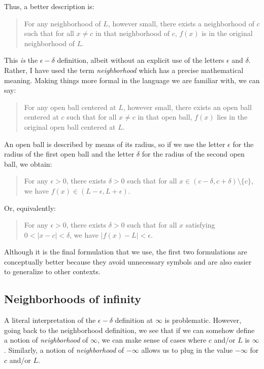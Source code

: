 \documentclass[10pt]{amsart}
\begin{document}
Thus, a better description is:

\begin{quote}
  For any neighborhood of $L$, however small, there exists a
  neighborhood of $c$ such that for all $x \ne c$ in that neighborhood
  of $c$, $f(x)$ is in the original neighborhood of $L$.
\end{quote}

This {\em is} the $\epsilon-\delta$ definition, albeit without an
explicit use of the letters $\epsilon$ and $\delta$. Rather, I have
used the term {\em neighborhood} which has a precise mathematical
meaning. Making things more formal in the language we are familiar
with, we can say:

\begin{quote}
  For any open ball centered at $L$, however small, there exists an
  open ball centered at $c$ such that for all $x \ne c$ in that open
  ball, $f(x)$ lies in the original open ball centered at $L$.
\end{quote}

An open ball is described by means of its radius, so if we use the
letter $\epsilon$ for the radius of the first open ball and the letter
$\delta$ for the radius of the second open ball, we obtain:

\begin{quote}
  For any $\epsilon > 0$, there exists $\delta > 0$ such that for all
  $x \in (c - \delta,c+\delta) \setminus \{ c \}$, we have $f(x) \in
  (L - \epsilon, L + \epsilon)$.
\end{quote}

Or, equivalently:

\begin{quote}
  For any $\epsilon > 0$, there exists $\delta > 0$ such that for all
  $x$ satisfying $0 < |x - c| < \delta$, we have $|f(x) - L| < \epsilon$.
\end{quote}

Although it is the final formulation that we use, the first two
formulations are conceptually better because they avoid unnecessary
symbols and are also easier to generalize to other contexts.

\subsection{Neighborhoods of infinity}

A literal interpretation of the $\epsilon-\delta$ definition at
$\infty$ is problematic. However, going back to the neighborhood
definition, we see that if we can somehow define a notion of {\em
neighborhood} of $\infty$, we can make sense of cases where $c$ and/or
$L$ is $\infty$. Similarly, a notion of {\em neighborhood} of
$-\infty$ allows us to plug in the value $-\infty$ for $c$ and/or $L$.
\end{document}
